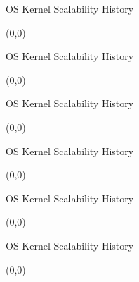 \documentclass[english]{beamer} %
\begin{document}
\begin{frame}{OS Kernel Scalability History}
\begin{textblock}{1}(0,0)
\end{textblock}
\end{frame}



\begin{frame}{OS Kernel Scalability History}
\begin{textblock}{1}(0,0)
\end{textblock}
\end{frame}



\begin{frame}{OS Kernel Scalability History}
\begin{textblock}{1}(0,0)
\end{textblock}
\end{frame}



\begin{frame}{OS Kernel Scalability History}
\begin{textblock}{1}(0,0)
\end{textblock}
\end{frame}



\begin{frame}{OS Kernel Scalability History}
\begin{textblock}{1}(0,0)
\end{textblock}
\end{frame}



\begin{frame}{OS Kernel Scalability History}
\begin{textblock}{1}(0,0)
\end{textblock}
\end{frame}
\end{document}
